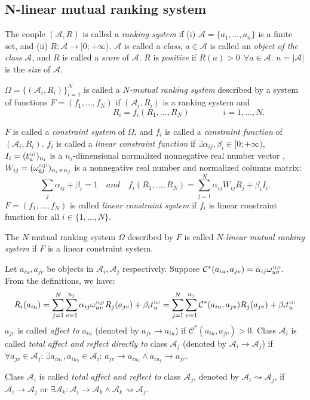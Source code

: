 \documentclass[lnicst]{svmultln}
\begin{document}
\subsection{N-linear mutual ranking system}
The couple $(\mathcal{A},R)$ is called a \emph{ranking system} if (i) $\mathcal{A} = \{a_1,\ldots,a_n\}$ is a finite set, and (ii) $R: \mathcal{A} \rightarrow [0;+\infty)$. $\mathcal{A}$ is called a \emph{class}, $a\in\mathcal{A}$ is called an \emph{object of the class} $\mathcal{A}$, and $R$ is called a \emph{score} of $\mathcal{A}$. $R$ is \emph{positive} if $R(a)>0 ~~\forall a \in \mathcal{A}$. $n = |\mathcal{A}|$ is the \emph{size} of $\mathcal{A}$.
\setlength{\parskip}{6pt}
\begin{definition}
$\Omega = \{(\mathcal{A}_i,R_i)\}_{i=1}^N$ is called a \emph{$N$-mutual ranking system} described by a system of functions $F = (f_1,\ldots,f_N)$ if $(\mathcal{A}_i,R_i)$ is a ranking system and
\[\qquad\qquad\qquad\qquad R_i = f_i(R_1,\ldots,R_N)\qquad\qquad i=1,\ldots,N.\]
\end{definition}
$F$ is called a \emph{constraint system} of $\Omega$, and $f_i$ is called a \emph{constraint function} of $(\mathcal{A}_i,R_i)$.
$f_i$ is called a \emph{linear constraint function} if  $ \exists\alpha_{ij}, \beta_i \in [0;+\infty)$, $I_i=(t^{\texttt{\tiny(i)}}_u)_{n_i}$ is a $n_i$-dimensional normalized nonnegative real number vector , $W_{ij}=(\omega^{\texttt{\tiny(ij)}}_{kl})_{n_i \times n_j}$ is a nonnegative real number and normalized columns matrix:
\[\sum_j\alpha_{ij}+ \beta_i=1\quad and \quad f_i(R_1,\ldots,R_N) = \sum^N_{j=1}\alpha_{ij}W_{ij}R_j + \beta_i I_i.\]
$F = (f_1,\ldots,f_N)$ is called \emph{linear constraint system} if $f_i$ is linear constraint function for all $i \in \{1,\ldots,N\}$.
\begin{definition}
The $N$-mutual ranking system $\Omega$ described by $F$ is called $N$-\emph{linear mutual ranking system} if $F$ is a linear constraint system.
\end{definition}
Let $a_{iu}, a_{jv}$ be objects in $\mathcal{A}_i, \mathcal{A}_j$ respectively. Suppose $\mathcal{C}^*(a_{iu},a_{jv})=\alpha_{ij}\omega^{\texttt{\tiny(ij)}}_{uv}.$
From the definitions, we have:
\[ R_i(a_{iu}) = \sum^N_{j=1}\sum^{n_j}_{v=1}\alpha_{ij}\omega^{\texttt{\tiny(ij)}}_{uv}R_j(a_{jv}) + \beta_i t^{\texttt{\tiny(i)}}_u=\sum^N_{j=1}\sum^{n_j}_{v=1}\mathcal{C}^*(a_{iu},a_{jv})R_j(a_{jv}) + \beta_i t^{\texttt{\tiny(i)}}_u\]
$a_{jv}$ is called \emph{affect to}  $a_{iu}$ (denoted by $a_{jv}\rightarrow a_{iu}$) if $\mathcal{C}^*(a_{iu},a_{jv})>0$. Class $\mathcal{A}_i$ is called  \emph{total affect and reflect directly to} class $\mathcal{A}_j$ (denoted by $\mathcal{A}_i\rightarrow \mathcal{A}_j$) if $\forall a_{jv}\in\mathcal{A}_j$:  $\exists a_{iu_1}, a_{iu_2}\in\mathcal{A}_i$: $a_{jv}\rightarrow a_{iu_2} \wedge a_{iu_1}\rightarrow a_{jv}$.
\begin{definition}
Class $\mathcal{A}_i$ is called  \emph{total affect and reflect to} class $\mathcal{A}_j$, denoted by $\mathcal{A}_i \rightsquigarrow \mathcal{A}_j$, if $\mathcal{A}_i\rightarrow \mathcal{A}_j$ or $\exists \mathcal{A}_k: \mathcal{A}_i\rightarrow \mathcal{A}_k \wedge \mathcal{A}_k \rightsquigarrow \mathcal{A}_j$.
\end{definition}
\end{document}
